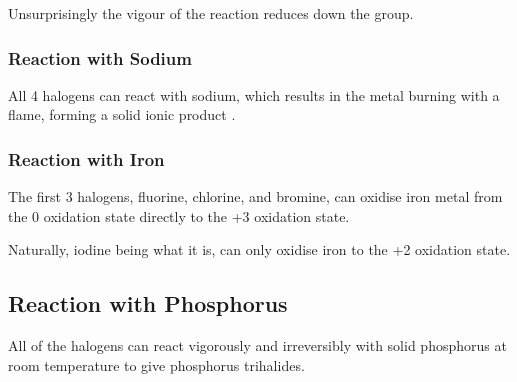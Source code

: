 			Unsurprisingly the vigour of the reaction reduces down the group.

			\subsubsection{Reaction with Sodium}

				All 4 halogens can react with sodium, which results in the metal burning with a  flame, forming a solid
				ionic product .




			\subsubsection{Reaction with Iron}

				The first 3 halogens, fluorine, chlorine, and bromine, can oxidise iron metal from the 0 oxidation state directly to the +3
				oxidation state.


				Naturally, iodine being what it is, can only oxidise iron to the +2 oxidation state.





		\pagebreak
		\subsection{Reaction with Phosphorus}

			All of the halogens can react vigorously and irreversibly with solid phosphorus at room temperature to give phosphorus trihalides.



